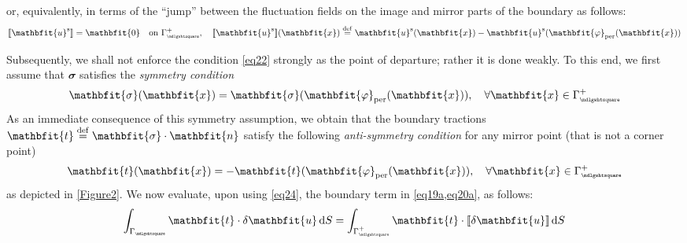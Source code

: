 \documentclass[12pt,a4paper]{article}
\renewcommand{\ta}[1]{\mathbfit{#1}}
\renewcommand{\ts}[1]{\mathbfit{#1}}
\renewcommand{\Box}{\mdlgwhtsquare}
\DeclarePairedDelimiter{\jmp}{[\![}{]\!]}
\newcommand{\per}{\mathrm{per}}
\newcommand{\rve}{
  {\mathchoice
   {\mbox{\scalebox{0.67}{$\Box$}}}
   {\mbox{\scalebox{0.67}{$\Box$}}}
   {\mbox{\scalebox{0.5}{$\Box$}}}
   {\mbox{\scalebox{0.375}{$\Box$}}}
  }
}
\begin{document}
or, equivalently, in terms of the ``jump'' between the fluctuation fields on the image and mirror parts of the boundary as follows:
\begin{equation}
    \jmp{\ta{u}^\fluct} = \ta{0} \quad \makebox{on } \Gamma_\rve^+, \quad
    \jmp{\ta{u}^\fluct}(\ta{x}) \defeq \ta{u}^\fluct(\ta{x})-\ta{u}^\fluct(\ta{\varphi}_\per(\ta{x}))
\label{eq22}
\end{equation}

Subsequently, we shall not enforce the condition \cref{eq22} strongly as the point of departure; rather it is done weakly.
To this end, we first assume that $\ts{\sigma}$ satisfies the \emph{symmetry condition}
\begin{equation}
    \ts{\sigma}(\ta{x}) = \ts{\sigma}(\ta{\varphi}_\per(\ta{x})), \quad
    \forall \ta{x}\in\Gamma_\rve^+
\label{eq23}
\end{equation}
As an immediate consequence of this symmetry assumption, we obtain that the boundary tractions $\ta{t}\defeq\ts{\sigma}\cdot\ta{n}$ satisfy the following \emph{anti-symmetry condition} for any mirror point (that is not a corner point)
\begin{equation}
    \ta{t}(\ta{x}) = -\ta{t}(\ta{\varphi}_\per(\ta{x})), \quad
    \forall \ta{x}\in\Gamma_\rve^+
\label{eq24}
\end{equation}
as depicted in \cref{Figure2}.
We now evaluate, upon using \cref{eq24}, the boundary term in
\cref{eq19a,eq20a}, as follows:
\begin{equation}
    \int_{\Gamma_\rve} \ta{t} \cdot \delta \ta{u} \dif S =
    \int_{\Gamma_{\rve}^+} \ta{t} \cdot \jmp{\delta \ta{u}} \dif S
\label{eq25}
\end{equation}
\end{document}
